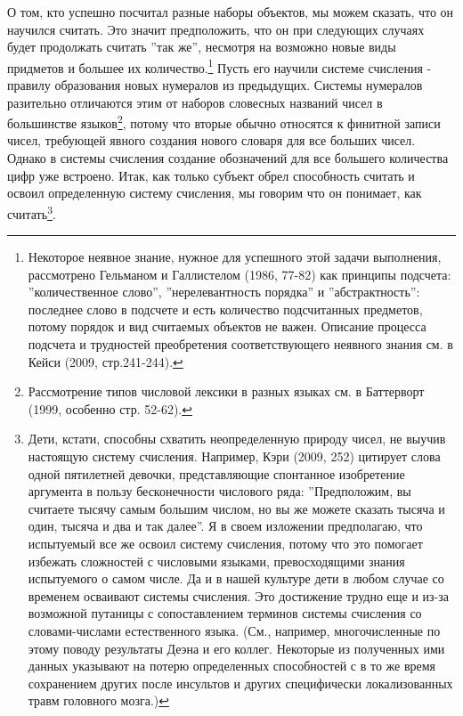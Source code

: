 \documentclass{book}
\begin{document}
О том, кто успешно посчитал разные наборы объектов, мы можем сказать, что он научился считать. Это значит предположить, что он при следующих случаях будет продолжать считать ''так же'', несмотря на возможно новые виды придметов и большее их количество.\footnote{Некоторое неявное знание, нужное для успешного этой задачи выполнения, рассмотрено Гельманом и Галлистелом (1986, 77-82) как принципы подсчета: ''количественное слово'', ''нерелевантность порядка'' и ''абстрактность'': последнее слово в подсчете и есть количество подсчитанных предметов, потому порядок и вид считаемых объектов не важен. Описание процесса подсчета и трудностей преобретения соответствующего неявного знания см. в Кейси (2009, стр.241-244).} Пусть его научили системе счисления - правилу образования новых нумералов из предыдущих. Системы нумералов разительно отличаются этим от наборов словесных названий чисел в большинстве языков\footnote{Рассмотрение типов числовой лексики в разных языках см. в Баттерворт (1999, особенно стр. 52-62).}, потому что вторые обычно относятся к финитной записи чисел, требующей явного создания нового словаря для все больших чисел. Однако в системы счисления создание обозначений для все большего количества цифр уже встроено. Итак, как только субъект обрел способность считать и освоил определенную систему счисления, мы говорим что он понимает, как считать\footnote{Дети, кстати, способны схватить неопределенную природу чисел, не выучив настоящую систему счисления. Например, Кэри (2009, 252) цитирует слова одной пятилетней девочки, представляющие спонтанное изобретение аргумента в пользу бесконечности числового ряда: ''Предположим, вы считаете тысячу самым большим числом, но вы же можете сказать тысяча и один, тысяча и два и так далее''. Я в своем изложении предполагаю, что испытуемый все же освоил систему счисления, потому что это помогает избежать сложностей с числовыми языками, превосходящими знания испытуемого о самом числе. Да и в нашей культуре дети в любом случае со временем осваивают системы счисления. Это достижение трудно еще и из-за возможной путаницы с сопоставлением терминов системы счисления со словами-числами естественного языка. (См., например, многочисленные по этому поводу результаты Деэна и его коллег. Некоторые из полученных ими данных указывают на потерю определенных способностей с в то же время сохранением других после инсультов и других специфически локализованных травм головного мозга.)}.
\end{document}
